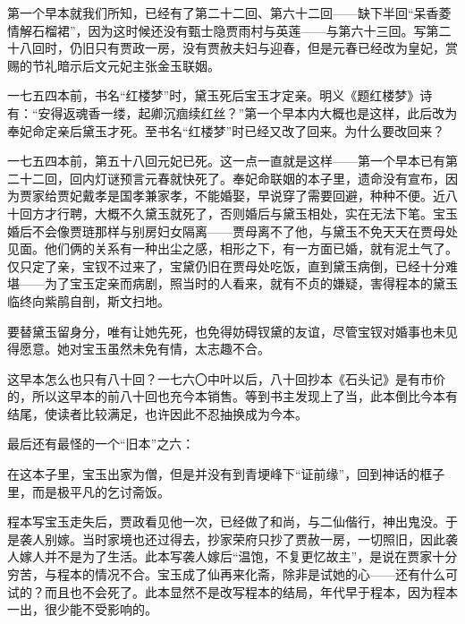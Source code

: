 \par 第一个早本就我们所知，已经有了第二十二回、第六十二回——缺下半回“呆香菱情解石榴裙”，因为这时候还没有甄士隐贾雨村与英莲——与第六十三回。写第二十八回时，仍旧只有贾政一房，没有贾赦夫妇与迎春，但是元春已经改为皇妃，赏赐的节礼暗示后文元妃主张金玉联姻。
\par 一七五四本前，书名“红楼梦”时，黛玉死后宝玉才定亲。明义《题红楼梦》诗有：“安得返魂香一缕，起卿沉痼续红丝？”第一个早本内大概也是这样，此后改为奉妃命定亲后黛玉才死。至书名“红楼梦”时已经又改了回来。为什么要改回来？
\par 一七五四本前，第五十八回元妃已死。这一点一直就是这样——第一个早本已有第二十二回，回内灯谜预言元春就快死了。奉妃命联姻的本子里，遗命没有宣布，因为贾家给贾妃戴孝是国孝兼家孝，不能婚娶，早说穿了需要回避，种种不便。近八十回方才行聘，大概不久黛玉就死了，否则婚后与黛玉相处，实在无法下笔。宝玉婚后不会像贾琏那样与别房妇女隔离——贾母离不了他，与黛玉不免天天在贾母处见面。他们俩的关系有一种出尘之感，相形之下，有一方面已婚，就有泥土气了。仅只定了亲，宝钗不过来了，宝黛仍旧在贾母处吃饭，直到黛玉病倒，已经十分难堪——为了宝玉定亲而病剧，照当时的人看来，就有不贞的嫌疑，害得程本的黛玉临终向紫鹃自剖，斯文扫地。
\par 要替黛玉留身分，唯有让她先死，也免得妨碍钗黛的友谊，尽管宝钗对婚事也未见得愿意。她对宝玉虽然未免有情，太志趣不合。
\par 这早本怎么也只有八十回？一七六〇中叶以后，八十回抄本《石头记》是有市价的，所以这早本的前八十回也充今本销售。等到书主发现上了当，此本倒比今本有结尾，使读者比较满足，也许因此不忍抽换成为今本。
\par 最后还有最怪的一个“旧本”之六：
\par 在这本子里，宝玉出家为僧，但是并没有到青埂峰下“证前缘”，回到神话的框子里，而是极平凡的乞讨斋饭。
\par 程本写宝玉走失后，贾政看见他一次，已经做了和尚，与二仙偕行，神出鬼没。于是袭人别嫁。当时家境也还过得去，抄家荣府只抄了贾赦一房，一切照旧，因此袭人嫁人并不是为了生活。此本写袭人嫁后“温饱，不复更忆故主”，是说在贾家十分穷苦，与程本的情况不合。宝玉成了仙再来化斋，除非是试她的心——还有什么可试的？而且也不会死了。此本显然不是改写程本的结局，年代早于程本，因为程本一出，很少能不受影响的。
